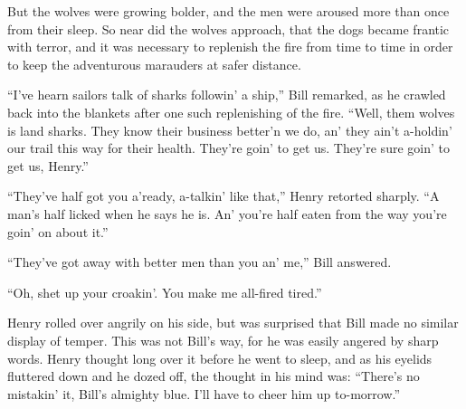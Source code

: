 But the wolves were growing bolder, and the men were aroused more than
once from their sleep. So near did the wolves approach, that the dogs
became frantic with terror, and it was necessary to replenish the fire
from time to time in order to keep the adventurous marauders at safer
distance.

“I’ve hearn sailors talk of sharks followin’ a ship,” Bill remarked, as
he crawled back into the blankets after one such replenishing of the
fire. “Well, them wolves is land sharks. They know their business
better’n we do, an’ they ain’t a-holdin’ our trail this way for their
health. They’re goin’ to get us. They’re sure goin’ to get us, Henry.”

“They’ve half got you a’ready, a-talkin’ like that,” Henry retorted
sharply. “A man’s half licked when he says he is. An’ you’re half eaten
from the way you’re goin’ on about it.”

“They’ve got away with better men than you an’ me,” Bill answered.

“Oh, shet up your croakin’. You make me all-fired tired.”

Henry rolled over angrily on his side, but was surprised that Bill made
no similar display of temper. This was not Bill’s way, for he was
easily angered by sharp words. Henry thought long over it before he
went to sleep, and as his eyelids fluttered down and he dozed off, the
thought in his mind was: “There’s no mistakin’ it, Bill’s almighty
blue. I’ll have to cheer him up to-morrow.”